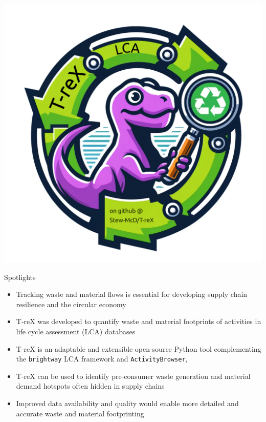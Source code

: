 \documentclass[review,3p,authoryear]{elsarticle}
\renewcommand{\texttt}[1]{{\ttfamily\small\nolinkurl{#1}}}
\begin{document}
\vspace{30em}
\includegraphics[width=\textwidth]{graphical-abstract.pdf}

\clearpage


{\Large Spotlights}
\vspace{1em}
\begin{itemize}
    \item Tracking waste and material flows is essential for developing supply chain resilience and the circular economy
    \item T-reX was developed to quantify waste and material footprints of activities in life cycle assessment (LCA) databases
    \item T-reX is an adaptable and extensible open-source Python tool complementing the \texttt{brightway} LCA framework and \texttt{ActivityBrowser},
    \item T-reX can be used to identify pre-consumer waste generation and material demand hotspots often hidden in supply chains
    \item Improved data availability and quality would enable more detailed and accurate waste and material footprinting
\end{itemize}
\end{document}

